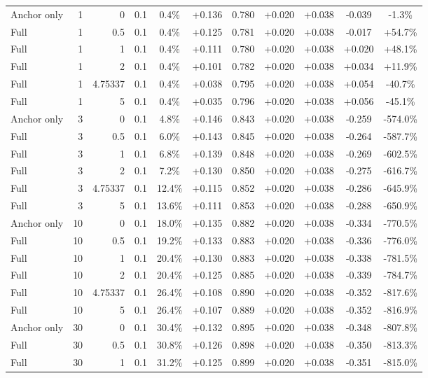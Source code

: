 \begin{table}[htbp]
\begin{tabular}{lrrrccccccc}
Anchor only & 1 & 0 & 0.1 & 0.4\% & +0.136 & 0.780 & +0.020 & +0.038 & -0.039 & -1.3\% \\
Full & 1 & 0.5 & 0.1 & 0.4\% & +0.125 & 0.781 & +0.020 & +0.038 & -0.017 & +54.7\% \\
Full & 1 & 1 & 0.1 & 0.4\% & +0.111 & 0.780 & +0.020 & +0.038 & +0.020 & +48.1\% \\
Full & 1 & 2 & 0.1 & 0.4\% & +0.101 & 0.782 & +0.020 & +0.038 & +0.034 & +11.9\% \\
Full & 1 & 4.75337 & 0.1 & 0.4\% & +0.038 & 0.795 & +0.020 & +0.038 & +0.054 & -40.7\% \\
Full & 1 & 5 & 0.1 & 0.4\% & +0.035 & 0.796 & +0.020 & +0.038 & +0.056 & -45.1\% \\
Anchor only & 3 & 0 & 0.1 & 4.8\% & +0.146 & 0.843 & +0.020 & +0.038 & -0.259 & -574.0\% \\
Full & 3 & 0.5 & 0.1 & 6.0\% & +0.143 & 0.845 & +0.020 & +0.038 & -0.264 & -587.7\% \\
Full & 3 & 1 & 0.1 & 6.8\% & +0.139 & 0.848 & +0.020 & +0.038 & -0.269 & -602.5\% \\
Full & 3 & 2 & 0.1 & 7.2\% & +0.130 & 0.850 & +0.020 & +0.038 & -0.275 & -616.7\% \\
Full & 3 & 4.75337 & 0.1 & 12.4\% & +0.115 & 0.852 & +0.020 & +0.038 & -0.286 & -645.9\% \\
Full & 3 & 5 & 0.1 & 13.6\% & +0.111 & 0.853 & +0.020 & +0.038 & -0.288 & -650.9\% \\
Anchor only & 10 & 0 & 0.1 & 18.0\% & +0.135 & 0.882 & +0.020 & +0.038 & -0.334 & -770.5\% \\
Full & 10 & 0.5 & 0.1 & 19.2\% & +0.133 & 0.883 & +0.020 & +0.038 & -0.336 & -776.0\% \\
Full & 10 & 1 & 0.1 & 20.4\% & +0.130 & 0.883 & +0.020 & +0.038 & -0.338 & -781.5\% \\
Full & 10 & 2 & 0.1 & 20.4\% & +0.125 & 0.885 & +0.020 & +0.038 & -0.339 & -784.7\% \\
Full & 10 & 4.75337 & 0.1 & 26.4\% & +0.108 & 0.890 & +0.020 & +0.038 & -0.352 & -817.6\% \\
Full & 10 & 5 & 0.1 & 26.4\% & +0.107 & 0.889 & +0.020 & +0.038 & -0.352 & -816.9\% \\
Anchor only & 30 & 0 & 0.1 & 30.4\% & +0.132 & 0.895 & +0.020 & +0.038 & -0.348 & -807.8\% \\
Full & 30 & 0.5 & 0.1 & 30.8\% & +0.126 & 0.898 & +0.020 & +0.038 & -0.350 & -813.3\% \\
Full & 30 & 1 & 0.1 & 31.2\% & +0.125 & 0.899 & +0.020 & +0.038 & -0.351 & -815.0\% \\

\end{tabular}
\end{table}
